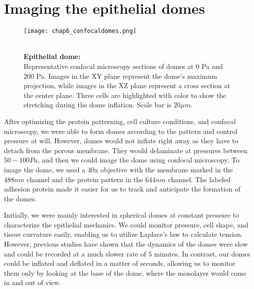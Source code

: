 \hypertarget{imaging-the-epithelial-domes}{%
\section{Imaging the epithelial
domes}\label{imaging-the-epithelial-domes}}





\begin{figure}
	\begin{minipage}[c]{0.6\textwidth}
		\texttt{[image: chap6\_confocaldomes.png]}
	\end{minipage}\hfill
	\begin{minipage}[c]{0.35\textwidth}
		\caption{\\ \textbf{Epithelial dome:}\\ Representative confocal microscopy sections of domes at 0 Pa and 200 Pa. Images in the XY plane represent the dome's maximum projection, while images in the XZ plane represent a cross section at the center plane. Three cells are highlighted with color to show the stretching during the dome inflation. Scale bar is $20 \mu m$.
		} \label{fig_6_6}
	\end{minipage}
\end{figure}

After optimizing the protein patterning, cell culture conditions, and
confocal microscopy, we were able to form domes according to the pattern
and control pressure at will. However, domes would not inflate right
away as they have to detach from the porous membrane. They would
delaminate at pressures between \(50-100Pa\), and then we could image
the dome using confocal microscopy. To image the dome, we used a 40x
objective with the membrane marked in the \(488nm\) channel and the
protein pattern in the \(644nm\) channel. The labeled adhesion protein
made it easier for us to track and anticipate the formation of the
domes.

Initially, we were mainly interested in spherical domes at constant
pressure to characterize the epithelial mechanics. We could monitor
pressure, cell shape, and tissue curvature easily, enabling us to
utilize Laplace's law to calculate tension. However, previous studies
have shown that the dynamics of the domes were slow and could be
recorded at a much slower rate of \(5\) minutes. In contrast, our domes
could be inflated and deflated in a matter of seconds, allowing us to
monitor them only by looking at the base of the dome, where the
monolayer would come in and out of view.

